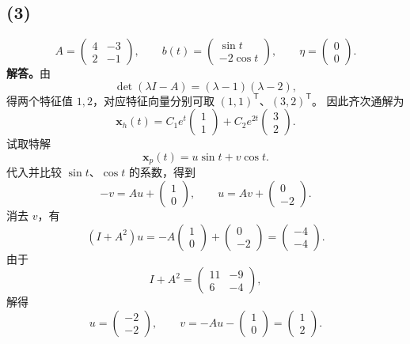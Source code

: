\documentclass[11pt,a4paper]{ctexart}
\newcommand{\xx}{\boldsymbol{x}}
\begin{document}
\subsection*{(3)}
\[
A=\begin{pmatrix}4&-3\\2&-1\end{pmatrix},\qquad
b(t)=\begin{pmatrix}\sin t\\-2\cos t\end{pmatrix},\qquad
\eta=\begin{pmatrix}0\\0\end{pmatrix}.
\]
\textbf{解答。}由
\[
\det(\lambda I-A)=(\lambda-1)(\lambda-2),
\]
得两个特征值 $1,2$，对应特征向量分别可取 $(1,1)^{\mathsf T}$、$(3,2)^{\mathsf T}$。
因此齐次通解为
\[
\xx_h(t)=C_1e^t\begin{pmatrix}1\\1\end{pmatrix}
+C_2e^{2t}\begin{pmatrix}3\\2\end{pmatrix}.
\]
试取特解
\[
\xx_p(t)=u\sin t+v\cos t.
\]
代入并比较 $\sin t$、$\cos t$ 的系数，得到
\[
-v=Au+\begin{pmatrix}1\\0\end{pmatrix},\qquad
u=Av+\begin{pmatrix}0\\-2\end{pmatrix}.
\]
消去 $v$，有
\[
(I+A^2)u=-A\begin{pmatrix}1\\0\end{pmatrix}
+\begin{pmatrix}0\\-2\end{pmatrix}
=\begin{pmatrix}-4\\-4\end{pmatrix}.
\]
由于
\[
I+A^2=\begin{pmatrix}11&-9\\6&-4\end{pmatrix},
\]
解得
\[
u=\begin{pmatrix}-2\\-2\end{pmatrix},\qquad
v=-Au-\begin{pmatrix}1\\0\end{pmatrix}=\begin{pmatrix}1\\2\end{pmatrix}.
\]
\end{document}
